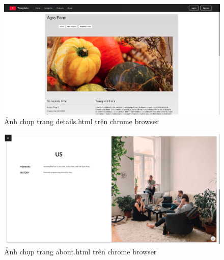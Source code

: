 \documentclass[a4paper]{article}
\begin{document}
\begin{figure}[H]
\begin{center}
\includegraphics[page=1, scale=0.215]{screenshot/chrome6.png}
\caption{Ảnh chụp trang details.html trên chrome browser}
\end{center}
\end{figure}

\begin{figure}[H]
\begin{center}
\includegraphics[page=1, scale=0.215]{screenshot/chrome7.png}
\caption{Ảnh chụp trang about.html trên chrome browser}
\end{center}
\end{figure}

\end{document}
